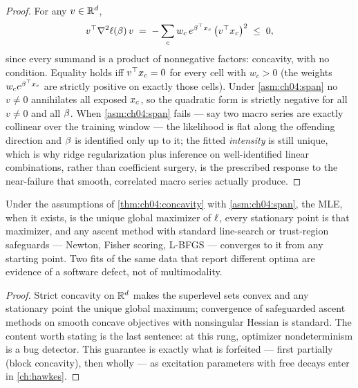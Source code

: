 \begin{proof}
For any $v \in \mathbb{R}^{d}$,
\[
v^{\top} \nabla^2 \ell(\beta)\, v
 \;=\;
 -\sum_{c} w_c\, e^{\beta^{\top}x_c}\, \big(v^{\top} x_c\big)^2
 \;\le\; 0,
\]
since every summand is a product of nonnegative factors: concavity, with
no condition. Equality holds iff $v^{\top}x_c = 0$ for every cell with
$w_c > 0$ (the weights $w_c e^{\beta^{\top}x_c}$ are strictly positive on
exactly those cells). Under \cref{asm:ch04:span} no $v \ne 0$ annihilates
all exposed $x_c$, so the quadratic form is strictly negative for all
$v \neq 0$ and all $\beta$. When \cref{asm:ch04:span} fails --- say two
macro series are exactly collinear over the training window --- the
likelihood is flat along the offending direction and $\beta$ is
identified only up to it; the fitted \emph{intensity} is still unique,
which is why ridge regularization plus inference on well-identified linear
combinations, rather than coefficient surgery, is the prescribed response
to the near-failure that smooth, correlated macro series actually produce.
\end{proof}

\begin{corollary}\label{cor:ch04:global}
Under the assumptions of \cref{thm:ch04:concavity} with
\cref{asm:ch04:span}, the MLE, when it exists, is the unique global
maximizer of $\ell$, every stationary point is that maximizer, and any
ascent method with standard line-search or trust-region safeguards ---
Newton, Fisher scoring, L-BFGS --- converges to it from any starting
point. Two fits of the same data that report different optima are
evidence of a software defect, not of multimodality.
\end{corollary}

\begin{proof}
Strict concavity on $\mathbb{R}^d$ makes the superlevel sets convex and any
stationary point the unique global maximum; convergence of safeguarded
ascent methods on smooth concave objectives with nonsingular Hessian is
standard. The content worth stating is the last sentence: at this rung,
optimizer nondeterminism is a bug detector. This guarantee is exactly what
is forfeited --- first partially (block concavity), then wholly --- as
excitation parameters with free decays enter in \cref{ch:hawkes}.
\end{proof}

